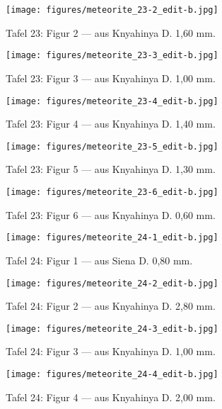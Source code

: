 \documentclass[a4paper, 12pt, oneside]{article}
\begin{document}
\clearpage
\begin{figure}[t]
\texttt{[image: figures/meteorite\_23-2\_edit-b.jpg]}
\caption{Tafel 23: Figur 2 --- aus Knyahinya D. 1,60 mm.}
\centering
\end{figure}
\clearpage
\begin{figure}[t]
\texttt{[image: figures/meteorite\_23-3\_edit-b.jpg]}
\caption{Tafel 23: Figur 3 --- aus Knyahinya D. 1,00 mm.}
\centering
\end{figure}
\clearpage
\begin{figure}[t]
\texttt{[image: figures/meteorite\_23-4\_edit-b.jpg]}
\caption{Tafel 23: Figur 4 --- aus Knyahinya D. 1,40 mm.}
\centering
\end{figure}
\clearpage
\begin{figure}[t]
\texttt{[image: figures/meteorite\_23-5\_edit-b.jpg]}
\caption{Tafel 23: Figur 5 --- aus Knyahinya D. 1,30 mm.}
\centering
\end{figure}
\clearpage
\begin{figure}[t]
\texttt{[image: figures/meteorite\_23-6\_edit-b.jpg]}
\caption{Tafel 23: Figur 6 --- aus Knyahinya D. 0,60 mm.}
\centering
\end{figure}
\clearpage
{}
\begin{figure}[t]
\texttt{[image: figures/meteorite\_24-1\_edit-b.jpg]}
\caption{Tafel 24: Figur 1 --- aus Siena D. 0,80 mm.}
\centering
\end{figure}
\clearpage
\begin{figure}[t]
\texttt{[image: figures/meteorite\_24-2\_edit-b.jpg]}
\caption{Tafel 24: Figur 2 --- aus Knyahinya D. 2,80 mm.}
\centering
\end{figure}
\clearpage
\begin{figure}[t]
\texttt{[image: figures/meteorite\_24-3\_edit-b.jpg]}
\caption{Tafel 24: Figur 3 --- aus Knyahinya D. 1,00 mm.}
\centering
\end{figure}
\clearpage
\begin{figure}[t]
\texttt{[image: figures/meteorite\_24-4\_edit-b.jpg]}
\caption{Tafel 24: Figur 4 --- aus Knyahinya D. 2,00 mm.}
\centering
\end{figure}
\end{document}

